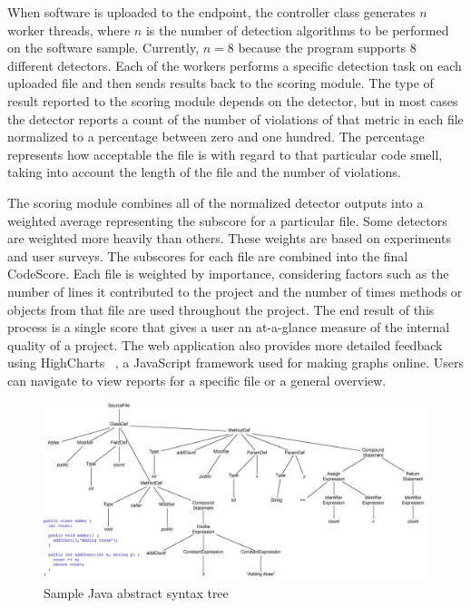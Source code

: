 \documentclass{sig-alternate}
\begin{document}
When software is uploaded to the endpoint, the controller class
generates $n$ worker threads, where $n$ is the number of detection algorithms to be
performed on the software sample. Currently, $n=8$ because the program supports $8$
different detectors. Each of the workers performs a specific detection task on
each uploaded file and then sends results back to the scoring module. The
type of result reported to the scoring module depends on the detector, but in
most cases the detector reports a count of the number of violations of that
metric in each file normalized to a percentage between zero and one hundred. The
percentage represents how acceptable the file is with regard to that particular
code smell, taking into account the length of the file and the number of
violations. 

The scoring module combines all of the normalized detector outputs into a
weighted average representing the subscore for a particular file. Some detectors
are weighted more heavily than others. These weights are based on experiments
and user surveys. The subscores for each file are combined into the final
CodeScore. Each file is weighted by importance, considering factors such as the
number of lines it contributed to the project and the number of times methods or
objects from that file are used throughout the project. The end result of this 
process is a single score that gives a user an at-a-glance measure of the internal quality of a project.
The web application also provides more detailed feedback using
HighCharts~\cite{highcharts} , a
JavaScript framework used for making graphs online. Users can navigate to view
reports for a specific file or a general overview.

\begin{figure}[ht]
	\begin{center}
		\includegraphics[width=0.9\linewidth]{syntax_tree}
	\end{center}
	\vspace{-12pt}
	\caption{Sample Java abstract syntax tree}
	\label{fig: ast}
\end{figure}
\end{document}
